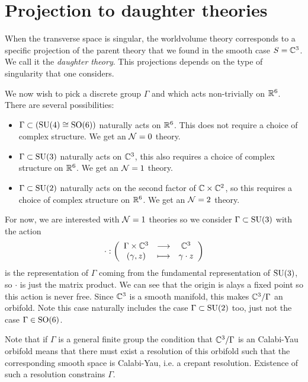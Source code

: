 \documentclass[a4paper,11pt]{article}
\begin{document}
\section{Projection to daughter theories}

    When the transverse space is singular, the worldvolume theory corresponds to a specific projection of the parent theory that we found in the smooth case $S=\mathbb{C}^3$. We call it the \emph{daughter theory}. This projections depends on the type of singularity that one considers.

    We now wish to pick a discrete group $\Gamma$ and which acts non-trivially on $\mathbb{R}^6$. There are several possibilities:
    \begin{itemize}
        \item $\Gamma\subset(\text{SU}(4)\cong\text{SO}(6))$ naturally acts on $\mathbb{R}^6$. This does not require a choice of complex structure. We get an $\mathcal{N}=0$ theory.
        \item $\Gamma\subset\text{SU}(3)$ naturally acts on $\mathbb{C}^3$, this also requires a choice of complex structure on $\mathbb{R}^6$. We get an $\mathcal{N}=1$ theory.
        \item $\Gamma\subset\text{SU}(2)$ naturally acts on the second factor of $\mathbb{C}\times\mathbb{C}^2$, so this requires a choice of complex structure on $\mathbb{R}^6$. We get an $\mathcal{N}=2$ theory.
    \end{itemize}

    For now, we are interested with $\mathcal{N}=1$ theories so we consider $\Gamma\subset\text{SU}(3)$ with the action
    \begin{equation}
        \cdot:\left(
        \begin{array}{ccc}
            \Gamma\times\mathbb{C}^3 & \longrightarrow & \mathbb{C}^3 \\
            (\gamma,z) & \longmapsto & \gamma\cdot z
        \end{array}
        \right)
    \end{equation}
    is the representation of $\Gamma$ coming from the fundamental representation of $\text{SU}(3)$, so $\cdot$ is just the matrix product. We can see that the origin is alays a fixed point so this action is never free. Since $\mathbb{C}^3$ is a smooth manifold, this makes $\mathbb{C}^3/\Gamma$ an orbifold. Note this case naturally includes the case $\Gamma\subset\text{SU}(2)$ too, just not the case $\Gamma\in\text{SO}(6)$.

    Note that if $\Gamma$ is a general finite group the condition that $\mathbb{C}^3/\Gamma$ is an Calabi-Yau orbifold means that there must exist a resolution of this orbifold such that the corresponding smooth space is Calabi-Yau, i.e. a crepant resolution. Existence of such a resolution constrains $\Gamma$\marker.
\end{document}
